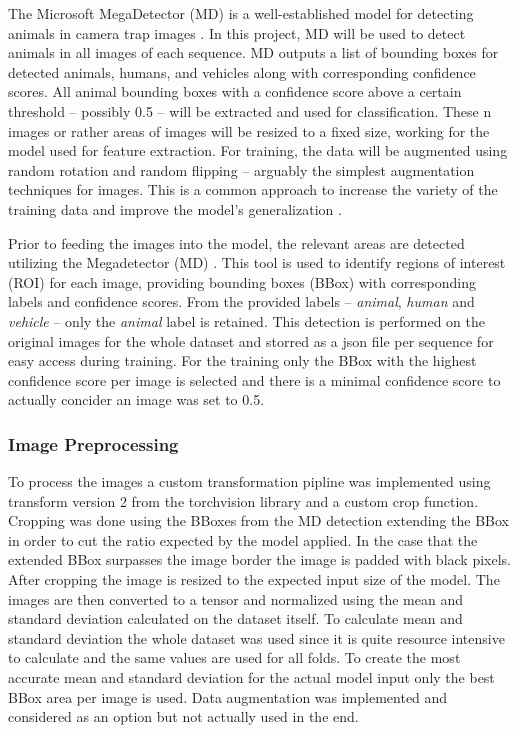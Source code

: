         The Microsoft MegaDetector (MD) is a well-established model for detecting animals in camera trap images \autocite{hernandezPytorchWildlifeCollaborativeDeep2024a, velezChoosingAppropriatePlatform2022, schneiderRecognitionEuropeanMammals2024}.
        In this project, MD will be used to detect animals in all images of each sequence. 
        MD outputs a list of bounding boxes for detected animals, humans, and vehicles along with corresponding confidence scores. 
        All animal bounding boxes with a confidence score above a certain threshold -- possibly 0.5 -- will be extracted and used for classification. 
        These n images or rather areas of images will be resized to a fixed size, working for the model used for feature extraction. 
        For training, the data will be augmented using random rotation and random flipping -- arguably the simplest augmentation techniques for images. 
        This is a common approach to increase the variety of the training data and improve the model's generalization \autocite{shortenSurveyImageData2019}.

        Prior to feeding the images into the model, the relevant areas are detected utilizing the Megadetector (MD) \autocite{morrisEfficientPipelineCamera2025}. 
        This tool is used to identify regions of interest (ROI) for each image, providing bounding boxes (BBox) with corresponding labels and confidence scores.
        From the provided labels -- \textit{animal}, \textit{human} and \textit{vehicle} -- only the \textit{animal} label is retained.
        This detection is performed on the original images for the whole dataset and storred as a json file per sequence for easy access during training.
        For the training only the BBox with the highest confidence score per image is selected and there is a minimal confidence score to actually concider an image was set to 0.5.
        

        \subsubsection{Image Preprocessing}
        To process the images a custom transformation pipline was implemented using transform version 2 from the torchvision library and a custom crop function.
        Cropping was done using the BBoxes from the MD detection extending the BBox in order to cut the ratio expected by the model applied.
        In the case that the extended BBox surpasses the image border the image is padded with black pixels.
        After cropping the image is resized to the expected input size of the model.
        The images are then converted to a tensor and normalized using the mean and standard deviation calculated on the dataset itself.
        To calculate mean and standard deviation the whole dataset was used since it is quite resource intensive to calculate and the same values are used for all folds.
        To create the most accurate mean and standard deviation for the actual model input only the best BBox area per image is used.
        Data augmentation was implemented and considered as an option but not actually used in the end.


